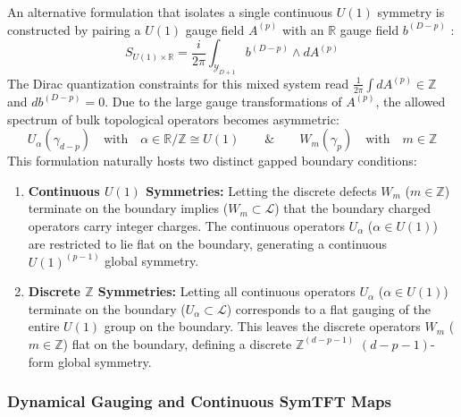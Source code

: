 \documentclass[aps,preprint,nofootinbib,preprintnumbers,eqsecnum,superscriptaddress]{revtex4}
\numberwithin{equation}{section}
\begin{document}
An alternative formulation that isolates a single continuous $U(1)$ symmetry is constructed by pairing a $U(1)$ gauge field $A^{(p)}$ with an $\mathbb{R}$ gauge field $b^{(D-p)}$ \cite{Antinucci_2025, Antinucci:2024bny}:
\begin{equation}\label{eq:u1_r_action}
    S_{U(1)\times\mathbb{R}} = \frac{i}{2\pi} \int_{\mathcal{Y}_{D+1}} b^{(D-p)} \wedge dA^{(p)}
\end{equation}
The Dirac quantization constraints for this mixed system read $\frac{1}{2\pi}\int dA^{(p)} \in \mathbb{Z}$ and $db^{(D-p)} = 0$. Due to the large gauge transformations of $A^{(p)}$, the allowed spectrum of bulk topological operators becomes asymmetric: 
\begin{equation}
    U_\alpha(\gamma_{d-p}) \quad \text{with} \quad \alpha \in \mathbb{R}/\mathbb{Z} \cong U(1) \qquad \& \qquad W_m(\gamma_p) \quad \text{with} \quad m \in \mathbb{Z}
\end{equation}
This formulation naturally hosts two distinct gapped boundary conditions:
\begin{enumerate}[\itshape i)]
    \item \textbf{Continuous $U(1)$ Symmetries:} Letting the discrete defects $W_m$ ($m \in \mathbb{Z}$) terminate on the boundary implies ($W_m \subset \mathcal{L}$) that the boundary charged operators carry integer charges. The continuous operators $U_\alpha$ ($\alpha \in U(1)$) are restricted to lie flat on the boundary, generating a continuous $U(1)^{(p-1)}$ global symmetry.
    \item \textbf{Discrete $\mathbb{Z}$ Symmetries:} Letting all continuous operators $U_\alpha$ ($\alpha \in U(1)$) terminate on the boundary ($U_\alpha \subset \mathcal{L}$) corresponds to a flat gauging of the entire $U(1)$ group on the boundary. This leaves the discrete operators $W_m$ ($m \in \mathbb{Z}$) flat on the boundary, defining a discrete $\mathbb{Z}^{(d-p-1)}$ $(d-p-1)$-form global symmetry.
\end{enumerate}

\subsubsection{Dynamical Gauging and Continuous SymTFT Maps}
\label{sec:dynamical_gauging_symtft}
\end{document}
